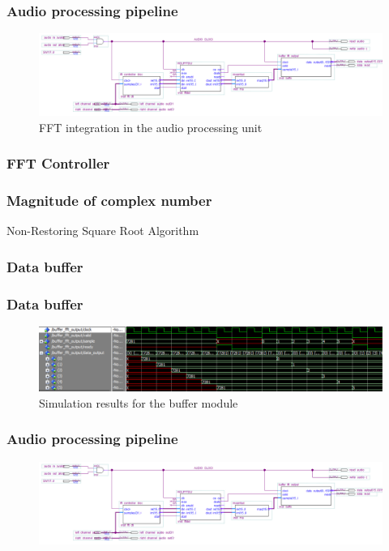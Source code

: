 \documentclass{beamer}
\begin{document}
\begin{frame}\frametitle{Audio processing pipeline}
\begin{figure}[!htb]
  \centering
  \includegraphics[width=\textwidth]{full_filter.PNG}
  \caption{FFT integration in the audio processing unit}
  \label{fig:block_filter}
\end{figure}
\end{frame}

\begin{frame}\frametitle{FFT Controller}

\end{frame}

\begin{frame}\frametitle{Magnitude of complex number}


Non-Restoring Square Root Algorithm
\end{frame}

\begin{frame}\frametitle{Data buffer}

\end{frame}

\begin{frame}\frametitle{Data buffer}

\begin{figure}[!htb]
  \centering
  \includegraphics[width=\textwidth]{buffer_sim.PNG}
  \caption{Simulation results for the buffer module}
  \label{fig:buff_sim}
\end{figure}
\end{frame}

\begin{frame}\frametitle{Audio processing pipeline}
\begin{figure}[!htb]
  \centering
  \includegraphics[width=\textwidth]{full_filter.PNG}
\end{figure}
\end{frame}
\end{document}
